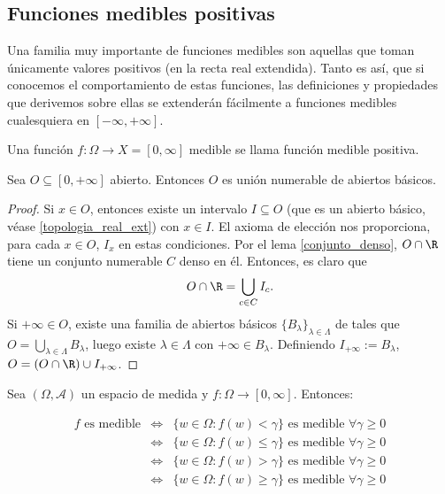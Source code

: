 
\subsection{Funciones medibles positivas}

Una familia muy importante de funciones medibles son aquellas que toman únicamente valores positivos (en la recta real extendida). Tanto es así, que si conocemos el comportamiento de estas funciones, las definiciones y propiedades que derivemos sobre ellas se extenderán fácilmente a funciones medibles cualesquiera en $[-\infty,+\infty]$.

\begin{ndef}
  Una función $f: \Omega \to X = [0,\infty ]$ medible se llama función medible positiva.
\end{ndef}

\begin{lema} \label{abierto_union_numerable}
	Sea $O \subseteq [0, +\infty]$ abierto. Entonces $O$ es unión numerable de abiertos básicos.
\end{lema}

\begin{proof}
	Si $x\in O$, entonces existe un intervalo $I \subseteq O$ (que es un abierto básico, véase \ref{topologia_real_ext}) con $x\in I$. El axioma de elección nos proporciona,
	para cada $x\in O$,  $I_x$ en estas condiciones. Por el lema \ref{conjunto_denso},  $O\cap \R$ tiene un conjunto numerable $C$ denso en él. Entonces, es claro que
	\[
		O\cap \R = \bigcup_{c\in C}I_c
	.\] 
	Si $+\infty\in O$, existe una familia de abiertos básicos $\{B_\lambda\}_{\lambda\in \Lambda}$ de tales que $O = \bigcup_{\lambda\in\Lambda} B_\lambda$, luego existe $\lambda\in\Lambda$ con $+\infty\in B_\lambda$. Definiendo  $I_{+\infty} := B_\lambda$, $O = (O\cap \R) \cup I_{+\infty}$.
\end{proof}

\begin{nprop} \label{criterio_medibles} Sea $(\Omega,\mathscr A)$ un espacio de medida y $f:\Omega \to [0,\infty]$. Entonces:

  \[
  \begin{array}{lll}
    \text{$f$ es medible} & \iff & \{w \in \Omega : f(w) < \gamma \} \text{ es medible } \forall \gamma \geq 0\\

    & \iff & \{w \in \Omega : f(w) \leq \gamma \} \text{ es medible } \forall \gamma \geq 0\\

    & \iff & \{w \in \Omega : f(w) > \gamma \} \text{ es medible } \forall \gamma \geq 0\\

    & \iff & \{w \in \Omega : f(w) \geq \gamma \} \text{ es medible } \forall \gamma \geq 0
    \end{array}
  \]
\end{nprop}



